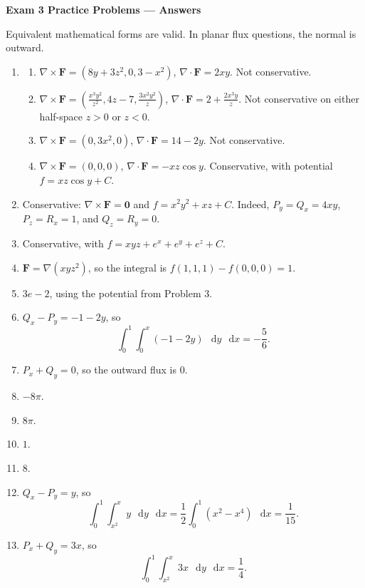 \documentclass[11pt,letterpaper]{article}
\newcommand{\curl}{\nabla\times}
\newcommand{\dv}{\nabla\cdot}
\renewcommand{\vec}[1]{\mathbf{#1}}
\newcommand{\dd}{\mathop{}\!\mathrm{d}}
\begin{document}
{\large\bfseries Exam 3 Practice Problems --- Answers}
\par\smallskip
 Equivalent mathematical forms
are valid. In planar flux questions, the normal is outward.
\setlength{\abovedisplayskip}{4pt}
\setlength{\belowdisplayskip}{4pt}
\setlength{\abovedisplayshortskip}{3pt}
\setlength{\belowdisplayshortskip}{3pt}

\begin{enumerate}
\item
\begin{enumerate}[label=(\alph*),leftmargin=1.6em,itemsep=5pt]
\item $\curl\vec F=(8y+3z^2,0,3-x^2)$,
$\dv\vec F=2xy$. Not conservative.
\item $\displaystyle\curl\vec F=
\left(\frac{x^3y^2}{z^2},4z-7,\frac{3x^2y^2}{z}\right)$,
$\displaystyle\dv\vec F=2+\frac{2x^3y}{z}$.
Not conservative on either half-space $z>0$ or $z<0$.
\item $\curl\vec F=(0,3x^2,0)$,
$\dv\vec F=14-2y$. Not conservative.
\item $\curl\vec F=(0,0,0)$,
$\dv\vec F=-xz\cos y$. Conservative, with potential
$f=xz\cos y+C$.
\end{enumerate}

\item Conservative: $\curl\vec F=\vec0$ and
$\boxed{f=x^2y^2+xz+C}$.
Indeed, $P_y=Q_x=4xy$, $P_z=R_x=1$, and $Q_z=R_y=0$.

\item Conservative, with $\boxed{f=xyz+e^x+e^y+e^z+C}$.

\item $\vec F=\nabla(xyz^2)$, so the integral is
$f(1,1,1)-f(0,0,0)=\boxed{1}$.

\item $\boxed{3e-2}$, using the potential from Problem 3.

\item $Q_x-P_y=-1-2y$, so
\[
\int_0^1\int_0^x(-1-2y)\,\dd y\,\dd x=\boxed{-\frac56}.
\]

\item $P_x+Q_y=0$, so the outward flux is $\boxed{0}$.

\item $\boxed{-8\pi}$.
\item $\boxed{8\pi}$.
\item $\boxed{1}$.
\item $\boxed{8}$.

\item $Q_x-P_y=y$, so
\[
\int_0^1\int_{x^2}^{x}y\,\dd y\,\dd x
=\frac12\int_0^1(x^2-x^4)\,\dd x
=\boxed{\frac1{15}}.
\]

\item $P_x+Q_y=3x$, so
\[
\int_0^1\int_{x^2}^{x}3x\,\dd y\,\dd x=\boxed{\frac14}.
\]
\end{enumerate}
\end{document}
